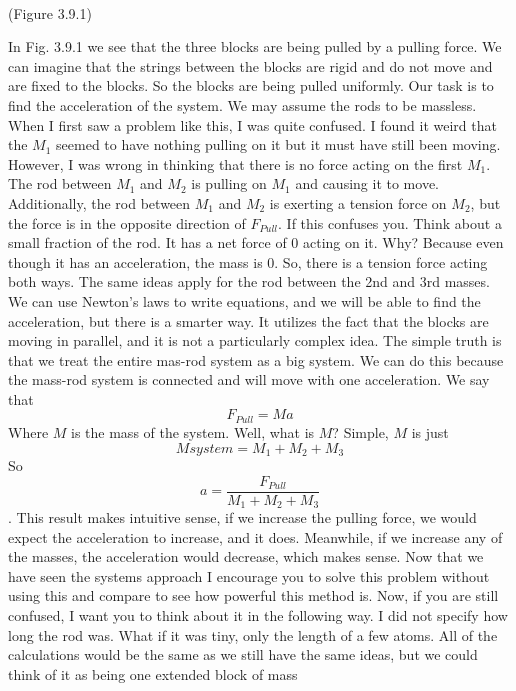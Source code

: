 \
\newline
{}
\newline
\begin{center}
(Figure 3.9.1)
\end{center}
In Fig. 3.9.1 we see that the three blocks are being pulled by a pulling force. We can imagine that the strings between the blocks are rigid and do not move and are fixed to the blocks. So the blocks are being pulled uniformly. Our task is to find the acceleration of the system. We may assume the rods to be massless. When I first saw a problem like this, I was quite confused. I found it weird that the $M_1$ seemed to have nothing pulling on it but it must have still been moving. However, I was wrong in thinking that there is no force acting on the first $M_1$. The rod between $M_1$ and $M_2$ is pulling on $M_1$ and causing it to move. Additionally, the rod between $M_1$ and $M_2$ is exerting a tension force on $M_2$, but the force is in the opposite direction of $F_{Pull}$. If this confuses you. Think about a small fraction of the rod. It has a net force of 0 acting on it. Why? Because even though it has an acceleration, the mass is 0. So, there is a tension force acting both ways. The same ideas apply for the rod between the 2nd and 3rd masses. We can use Newton’s laws to write equations, and we will be able to find the acceleration, but there is a smarter way. It utilizes the fact that the blocks are moving in parallel, and it is not a particularly complex idea. The simple truth is that we treat the entire mas-rod system as a big system. We can do this because the mass-rod system is connected and will move with one acceleration. We say that $$F_{Pull}=Ma$$ Where $M$ is the mass of the system. Well, what is $M$? Simple, $M$ is just $$M{system} = M_1+M_2+M_3$$ So \begin{equation}a=\frac{F_{Pull}}{M_1+M_2+M_3}\end{equation}. This result makes intuitive sense, if we increase the pulling force, we would expect the acceleration to increase, and it does. Meanwhile, if we increase any of the masses, the acceleration would decrease, which makes sense. Now that we have seen the systems approach I encourage you to solve this problem without using this and compare to see how powerful this method is. Now, if you are still confused, I want you to think about it in the following way. I did not specify how long the rod was. What if it was tiny, only the length of a few atoms. All of the calculations would be the same as we still have the same ideas, but we could think of it as being one extended block of mass 